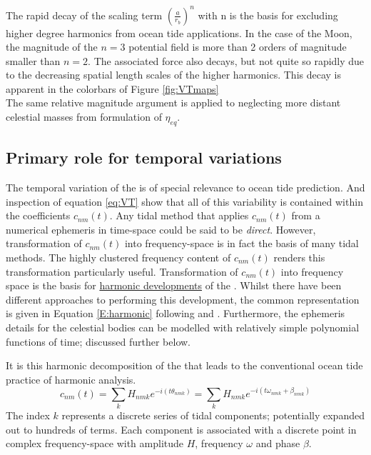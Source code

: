 The rapid decay of the scaling term $\left(\frac{a}{r_b} \right)^n$ with n is the basis for excluding higher degree harmonics from ocean tide applications.  In the case of the Moon, the magnitude of the $n=3$ potential field is more than 2 orders of magnitude smaller than $n=2$.  The associated force also decays, but not quite so rapidly due to the decreasing spatial length scales of the higher harmonics.  This decay is apparent in the colorbars of Figure \ref{fig:VTmaps}\\
The same relative magnitude argument is applied to neglecting more distant celestial masses from formulation of $\eta_{eq}$.

\subsection{Primary role for temporal variations}
\label{sec:temporal}
The temporal variation of the \ATGP{} is of special relevance to ocean tide prediction.  And inspection of equation \ref{eq:VT} show that all of this variability is contained within the coefficients $c_{nm}(t)$.  
Any tidal method that applies $c_{nm}(t)$ from a numerical ephemeris in time-space could be said to be \emph{direct}. 
However, transformation of $c_{nm}(t)$ into frequency-space is in fact the basis of many tidal methods.   The highly clustered frequency content of $c_{nm}(t)$ renders this transformation particularly useful.  
Transformation of $c_{nm}(t)$ into frequency space is the basis for \underline{harmonic developments} of the \ATGP{}. Whilst there have been different approaches to performing this development, the common representation is given in Equation \ref{E:harmonic} following \citep{Desai:2006wo} and \citep[Eq 13]{Cartwright:1971iz}.
Furthermore, the ephemeris details for the celestial bodies can be modelled with relatively simple polynomial functions of time; discussed further below. 


It is this harmonic decomposition of the \ATGP{} that leads to the conventional ocean tide practice of harmonic analysis.
\begin{equation}
    c_{nm}(t) = \sum_{k} H_{nmk} e^{-i( t\theta_{nmk})} = \sum_{k} H_{nmk} e^{-i( t\omega_{nmk} + \beta_{nmk})}
    \label{E:harmonic}
\end{equation}
The index $k$ represents a discrete series of tidal components; potentially expanded out to hundreds of terms.  Each component is associated with a discrete point in complex frequency-space with amplitude $H$, frequency $\omega$ and phase $\beta$.

